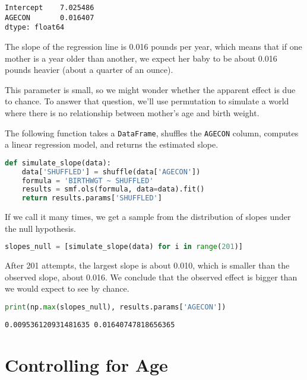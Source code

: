 \begin{lstlisting}[style=output]
Intercept    7.025486
AGECON       0.016407
dtype: float64
\end{lstlisting}

The slope of the regression line is 0.016 pounds per year, which means
that if one mother is a year older than another, we expect her baby to
be about 0.016 pounds heavier (about a quarter of an ounce).

This parameter is small, so we might wonder whether the apparent effect
is due to chance. To answer that question, we'll use permutation to
simulate a world where there is no relationship between mother's age and
birth weight.

\pagebreak

The following function takes a \passthrough{\lstinline!DataFrame!},
shuffles the \passthrough{\lstinline!AGECON!} column, computes a linear
regression model, and returns the estimated slope.

\begin{lstlisting}[language=Python,style=source]
def simulate_slope(data):
    data['SHUFFLED'] = shuffle(data['AGECON'])
    formula = 'BIRTHWGT ~ SHUFFLED'
    results = smf.ols(formula, data=data).fit()
    return results.params['SHUFFLED']
\end{lstlisting}

If we call it many times, we get a sample from the distribution of
slopes under the null hypothesis.

\begin{lstlisting}[language=Python,style=source]
slopes_null = [simulate_slope(data) for i in range(201)]
\end{lstlisting}

After 201 attempts, the largest slope is about 0.010, which is smaller
than the observed slope, about 0.016. We conclude that the observed
effect is bigger than we would expect to see by chance.

\begin{lstlisting}[language=Python,style=source]
print(np.max(slopes_null), results.params['AGECON'])
\end{lstlisting}

\begin{lstlisting}[style=output]
0.009536120931481635 0.01640747818656365
\end{lstlisting}

\section{Controlling for Age}\label{controlling-for-age}

